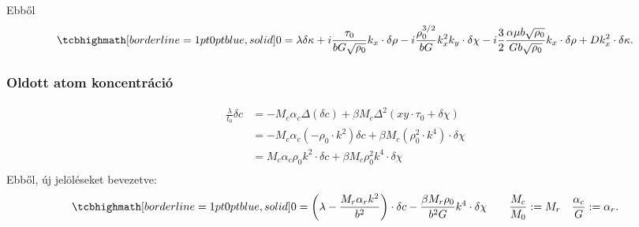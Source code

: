 \documentclass[10pt,a4paper]{scrartcl}
\begin{document}
Ebből
\begin{equation} \label{eq:lin_ed_kappa}
\tcbhighmath[borderline={1pt}{0pt}{blue,solid}]{
0 = \lambda \delta\kappa  + i\frac{{{\tau _0}}}{{bG\sqrt {{\rho _0}} }}{k_x} \cdot \delta \rho  - i\frac{{\rho _0^{3/2}}}{{bG}}k_x^2{k_y} \cdot \delta \chi  - i\frac{3}{2}\frac{{\alpha \mu b\sqrt {{\rho _0}} }}{{Gb\sqrt {{\rho _0}} }}{k_x} \cdot \delta \rho  + Dk_x^2 \cdot \delta \kappa.}
\end{equation}

\subsubsection{Oldott atom koncentráció}
\[\begin{aligned}
  \frac{\lambda }{{{t_0}}}\delta c &  =  - {M_c}{\alpha _c}\Delta \left( {\delta c} \right) + \beta {M_c}{\Delta ^2}\left( {xy \cdot {\tau _0} + \delta \chi } \right) \\ 
   &  =  - {M_c}{\alpha _c}\left( { - {\rho _0} \cdot {k^2}} \right)\delta c + \beta {M_c}\left( {\rho _0^2 \cdot {k^4}} \right) \cdot \delta \chi  \\ 
   &  = {M_c}{\alpha _c}{\rho _0}{k^2} \cdot \delta c + \beta {M_c}\rho _0^2{k^4} \cdot \delta \chi  \\ 
\end{aligned} \]
Ebből, új jelöléseket bevezetve:
\begin{equation} \label{eq:lin_ed_c}
\tcbhighmath[borderline={1pt}{0pt}{blue,solid}]{
0 = \left( {\lambda  - \frac{{{M_r}{\alpha _r}{k^2}}}{{{b^2}}}} \right) \cdot \delta c - \frac{{\beta {M_r}{\rho _0}}}{{{b^2}G}}{k^4} \cdot \delta \chi \qquad \frac{{{M_c}}}{{{M_0}}}: = {M_r}\quad \frac{{{\alpha _c}}}{G}: = {\alpha _r}.}
\end{equation}
\end{document}
